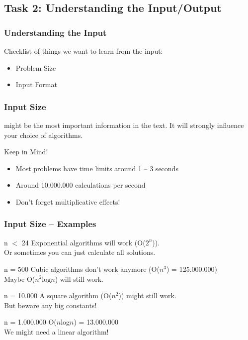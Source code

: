 \documentclass{beamer}
\begin{document}
\subsection{Task 2: Understanding the Input/Output}

\begin{frame}
  \frametitle{Understanding the Input}

  Checklist of things we want to learn from the input:
  \smallskip

  \begin{itemize}
  \item Problem Size
  \item Input Format
  \end{itemize}
\end{frame}

\begin{frame}
  \frametitle{Input Size} 
   might be the most
  important information in the text. It will 
  strongly influence your choice of algorithms.

  \begin{block}{Keep in Mind!}
    \begin{itemize}
    \item Most problems have time limits around 1 -- 3 seconds
    \item Around 10.000.000 calculations per second
    \item Don't forget multiplicative effects!
    \end{itemize}
  \end{block}
\end{frame}

\begin{frame}
  \frametitle{Input Size -- Examples}

  \begin{block}{n $<$ 24}
    Exponential algorithms will work (O($2^n$)).\\
    Or sometimes you can just calculate all solutions.
  \end{block}

  \begin{block}{n = 500}
    Cubic algorithms don't work anymore (O($n^3$) = 125.000.000)\\
    Maybe O($n^2\text{log}n$) will still work.
  \end{block}

  \begin{block}{n = 10.000}
    A square algorithm (O($n^2$)) might still work.\\
    But beware any big constants!
  \end{block}

  \begin{block}{n = 1.000.000}
    O($n$log$n$) = 13.000.000\\
    We might need a linear algorithm!
  \end{block}
\end{frame}
\end{document}
